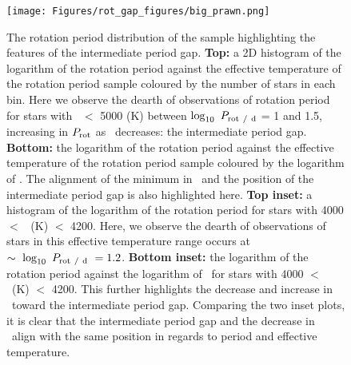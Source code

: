 \begin{figure}
\centering
 \texttt{[image: Figures/rot\_gap\_figures/big\_prawn.png]}
 \caption[The rotation period distribution of the \citep{mcquillan_rotation_2014} sample highlighting the features of the intermediate period gap.]{The rotation period distribution of the \citep{mcquillan_rotation_2014} sample highlighting the features of the intermediate period gap. \textbf{Top:} a 2D histogram of the logarithm of the rotation period against the effective temperature of the rotation period sample coloured by the number of stars in each bin. Here we observe the dearth of observations of rotation period for stars with \teff \ $<$ 5000 (K) between $\log_{10} \ P_{\rm{rot}\ / \ d}$ = 1 and 1.5, increasing in $P_{\rm{rot}}$ as \teff \ decreases: the intermediate period gap. \textbf{Bottom:} the logarithm of the rotation period against the effective temperature of the rotation period sample coloured by the logarithm of \rper{}. The alignment of the minimum in \rper\ and the position of the intermediate period gap is also highlighted here.  
 \textbf{Top inset:} a histogram of the logarithm of the rotation period for stars with 4000 $<$ \teff \ (K) $<$ 4200. Here, we observe the dearth of observations of stars in this effective temperature range occurs at $\sim \ \log_{10} \ P_{\rm{rot}\ / \ d} \ = 1.2$. 
 \textbf{Bottom inset:} the logarithm of the rotation period against the logarithm of \rper \ for stars with 4000 $<$ \teff \ (K) $<$ 4200. This further highlights the decrease and increase in \rper \ toward the intermediate period gap. Comparing the two inset plots, it is clear that the intermediate period gap and the decrease in \rper \ align with the same position in regards to period and effective temperature.}
 \label{fig:big_prawn}
\end{figure}


